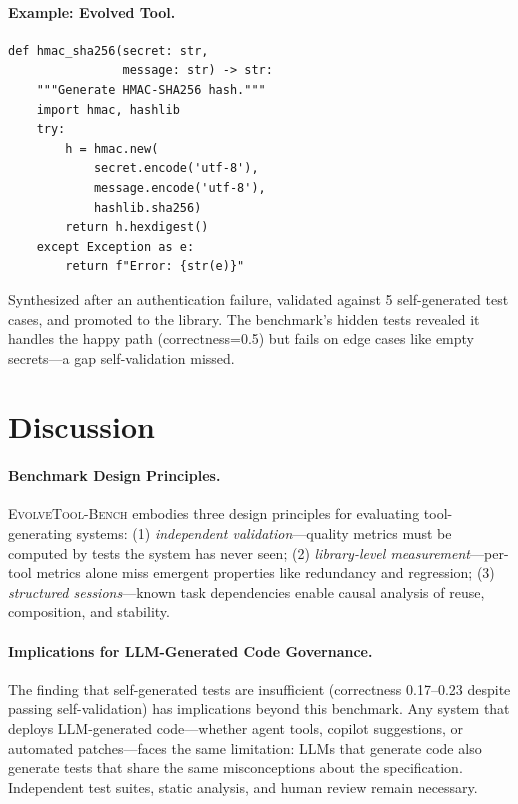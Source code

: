 \documentclass[10pt,twocolumn]{article}
\begin{document}
\paragraph{Example: Evolved Tool.}
\begin{lstlisting}
def hmac_sha256(secret: str,
                message: str) -> str:
    """Generate HMAC-SHA256 hash."""
    import hmac, hashlib
    try:
        h = hmac.new(
            secret.encode('utf-8'),
            message.encode('utf-8'),
            hashlib.sha256)
        return h.hexdigest()
    except Exception as e:
        return f"Error: {str(e)}"
\end{lstlisting}
Synthesized after an authentication failure, validated against 5 self-generated test cases, and promoted to the library. The benchmark's hidden tests revealed it handles the happy path (correctness=0.5) but fails on edge cases like empty secrets---a gap self-validation missed.

\section{Discussion}

\paragraph{Benchmark Design Principles.} \textsc{EvolveTool-Bench} embodies three design principles for evaluating tool-generating systems: (1) \emph{independent validation}---quality metrics must be computed by tests the system has never seen; (2) \emph{library-level measurement}---per-tool metrics alone miss emergent properties like redundancy and regression; (3) \emph{structured sessions}---known task dependencies enable causal analysis of reuse, composition, and stability.

\paragraph{Implications for LLM-Generated Code Governance.} The finding that self-generated tests are insufficient (correctness 0.17--0.23 despite passing self-validation) has implications beyond this benchmark. Any system that deploys LLM-generated code---whether agent tools, copilot suggestions, or automated patches---faces the same limitation: LLMs that generate code also generate tests that share the same misconceptions about the specification. Independent test suites, static analysis, and human review remain necessary.
\end{document}
